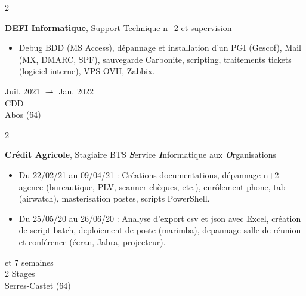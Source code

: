 \documentclass[11pt, a4paper]{article}
\newenvironment{highlights}{
    \begin{itemize}[
        topsep=0.10 cm,
        parsep=0.10 cm,
        partopsep=0pt,
        itemsep=0pt,
        leftmargin=0.4 cm + 10pt
    ]
}{
    \end{itemize}
} %
\newenvironment{twocolentry}[2][]{
    \onecolentry
    \def\secondColumn{#2}
    \setcolumnwidth{\fill, 4.5 cm}
    \begin{paracol}{2}
}{
    \switchcolumn \raggedleft \secondColumn
    \end{paracol}
    \endonecolentry
} %
\begin{document}
        \vspace{0.2 cm} %


        \begin{twocolentry}{
            Juil. 2021 $ \rightharpoonup $ Jan. 2022 \\
            CDD \\
            Abos (64)
        }
            \textbf{DEFI Informatique}, Support Technique n+2 et supervision 
            \begin{highlights}
                \item Debug BDD (MS Access), dépannage et installation d'un PGI (Gescof), Mail (MX, DMARC, SPF),
                sauvegarde Carbonite, scripting, traitements tickets (logiciel interne), VPS OVH, Zabbix.
            \end{highlights}
        \end{twocolentry}

        \vspace{0.2 cm}


        \begin{twocolentry}{
            4 et 7 semaines \\
            2 Stages \\
            Serres-Castet (64)
        }
            \textbf{Crédit Agricole}, Stagiaire BTS \textbf{\textit{S}}ervice \textbf{\textit{I}}nformatique aux \textbf{\textit{O}}rganisations
            \begin{highlights}
                \item Du 22/02/21 au 09/04/21 : Créations documentations, dépannage n+2 agence (bureautique, PLV, scanner chèques, etc.), enrôlement phone, tab (airwatch), masterisation postes, scripts PowerShell.
                \item Du 25/05/20 au 26/06/20 : Analyse d’export csv et json avec Excel, création de script batch, deploiement de poste (marimba), depannage salle de réunion et conférence (écran, Jabra, projecteur).
            \end{highlights}
        \end{twocolentry}

        \vspace{0.2 cm}

        
\end{document}
